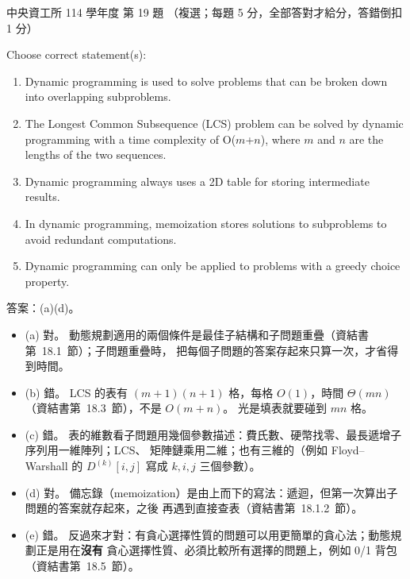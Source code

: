 \begin{pastexam}[label={px:ncu-114-dsa-19}]{中央資工所 114 學年度 第 19 題}
（複選；每題 5 分，全部答對才給分，答錯倒扣 1 分）

Choose correct statement(s):
\begin{enumerate}[label=(\alph*)]
\item Dynamic programming is used to solve problems that can be broken down into overlapping
subproblems.
\item The Longest Common Subsequence (LCS) problem can be solved by dynamic programming with a time
complexity of O($m$+$n$), where $m$ and $n$ are the lengths of the two sequences.
\item Dynamic programming always uses a 2D table for storing intermediate results.
\item In dynamic programming, memoization stores solutions to subproblems to avoid redundant
computations.
\item Dynamic programming can only be applied to problems with a greedy choice property.
\end{enumerate}
\end{pastexam}

\begin{pastsoln}
答案：(a)(d)。

\begin{itemize}
\item (a) 對。 動態規劃適用的兩個條件是最佳子結構和子問題重疊（資結書第~18.1~節）；子問題重疊時，
把每個子問題的答案存起來只算一次，才省得到時間。
\item (b) 錯。 LCS 的表有 $(m+1)(n+1)$ 格，每格 $O(1)$，時間 $\Theta(mn)$（資結書第~18.3~節），不是
$O(m + n)$。 光是填表就要碰到 $mn$ 格。
\item (c) 錯。 表的維數看子問題用幾個參數描述：費氏數、硬幣找零、最長遞增子序列用一維陣列；LCS、
矩陣鏈乘用二維；也有三維的（例如 Floyd--Warshall 的 $D^{(k)}[i, j]$ 寫成 $k, i, j$ 三個參數）。
\item (d) 對。 備忘錄（memoization）是由上而下的寫法：遞迴，但第一次算出子問題的答案就存起來，之後
再遇到直接查表（資結書第~18.1.2~節）。
\item (e) 錯。 反過來才對：有貪心選擇性質的問題可以用更簡單的貪心法；動態規劃正是用在\textbf{沒有}
貪心選擇性質、必須比較所有選擇的問題上，例如 0/1 背包（資結書第~18.5~節）。
\end{itemize}
\end{pastsoln}
